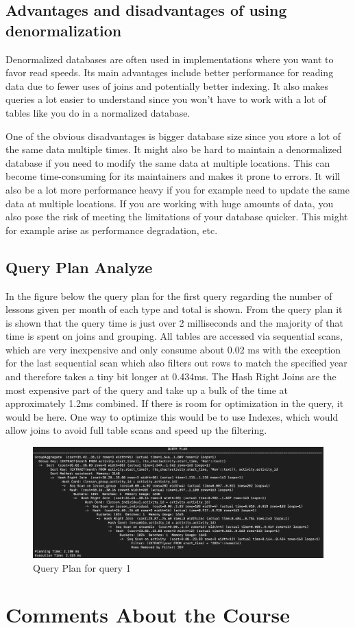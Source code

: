 \documentclass[a4paper]{scrartcl}
\begin{document}
\subsection{Advantages and disadvantages of using denormalization}
Denormalized databases are often used in implementations where you want to favor read speeds. Its main advantages include better performance for reading data due to fewer uses of joins and potentially better indexing. It also makes queries a lot easier to understand since you won't have to work with a lot of tables like you do in a normalized database.

One of the obvious disadvantages is bigger database size since you store a lot of the same data multiple times. It might also be hard to maintain a denormalized database if you need to modify the same data at multiple locations. This can become time-consuming for its maintainers and makes it prone to errors. It will also be a lot more performance heavy if you for example need to update the same data at multiple locations. If you are working with huge amounts of data, you also pose the risk of meeting the limitations of your database quicker. This might for example arise as performance degradation, etc.

\subsection{Query Plan Analyze}
In the figure below the query plan for the first query regarding the number of lessons given per month of each type and total is shown. From the query plan it is shown that the query time is just over 2 milliseconds and the majority of that time is spent on joins and grouping. All tables are accessed via sequential scans, which are very inexpensive and only consume about 0.02 ms with the exception for the last sequential scan which also filters out rows to match the specified year and therefore takes a tiny bit longer at 0.434ms. The Hash Right Joins are the most expensive part of the query and take up a bulk of the time at approximately 1.2ms combined. If there is room for optimization in the query, it would be here. One way to optimize this would be to use Indexes, which would allow joins to avoid full table scans and speed up the filtering.

\begin{figure}[H]
    \begin{center}
      \includegraphics[scale=0.6]{Explain Analyze Q1.png}
      \caption{Query Plan for query 1}
      \label{fig:diag}
    \end{center}
  \end{figure}

\section{Comments About the Course}
\end{document}
